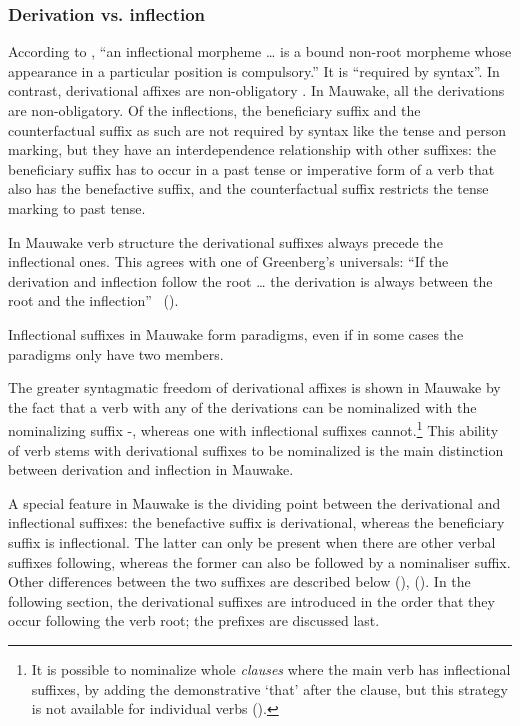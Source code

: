 \subsubsection{Derivation vs. inflection}
{}
According to \citet[81]{Bybee1985}, ``{an inflectional morpheme {\dots} is a bound non-root morpheme whose appearance in a particular position is compulsory}.'' It is ``{required by syntax}''. In contrast, derivational affixes are non-obligatory \citep[191]{Greenberg1954}. In Mauwake, all the derivations are non-obligatory. Of the inflections, the beneficiary suffix and the counterfactual suffix as such are not required by syntax like the tense and person marking, but they have an interdependence relationship with other suffixes: the beneficiary suffix has to occur in a past tense or imperative form of a verb that also has the benefactive suffix, and the counterfactual suffix restricts the tense marking to past tense.

In Mauwake verb structure the derivational suffixes always precede the inflectional ones. This agrees with one of {Greenberg}'s universals: ``{If the derivation and inflection follow the root {\dots} the derivation is always between the root and the inflection}'' \
(\citeyear[93]{Greenberg1966}).

Inflectional suffixes in Mauwake form paradigms, even if in some cases the paradigms only have two members.

The greater syntagmatic freedom of derivational affixes \citep[128--129]{Malkiel1978} is shown in Mauwake by the fact that a verb with any of the derivations can be nominalized with the nominalizing suffix \nobreakdash-, whereas one with inflectional suffixes cannot.\footnote{It is possible to nominalize whole \textit{clauses} where the main verb has inflectional suffixes, by adding the demonstrative  `that' after the clause, but this strategy is not available for individual verbs ().} This ability of verb stems with derivational suffixes to be nominalized is the main distinction between derivation and inflection in Mauwake. 

A special feature in Mauwake is the dividing point between the derivational and inflectional suffixes: the benefactive suffix is derivational, whereas the beneficiary suffix is inflectional. The latter can only be present when there are other verbal suffixes following, whereas the former can also be followed by a nominaliser suffix. Other differences between the two suffixes are described below (), (). In the following section, the derivational suffixes are introduced in the order that they occur following the verb root; the prefixes are discussed last.


